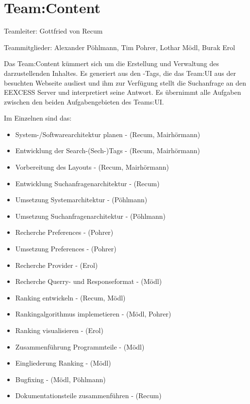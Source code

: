 \section*{Team:Content}

Teamleiter: Gottfried von Recum

Teammitglieder: Alexander Pöhlmann, Tim Pohrer, Lothar Mödl, Burak Erol

Das Team:Content kümmert sich um die Erstellung und Verwaltung des darzustellenden Inhaltes. Es generiert aus den \SEARCH-Tags, die das Team:UI aus der besuchten Webseite ausliest und ihm zur Verfügung stellt die Suchanfrage an den EEXCESS Server und interpretiert seine Antwort. Es übernimmt alle Aufgaben zwischen den beiden Aufgabengebieten des Teams:UI.

Im Einzelnen sind das:

\begin{itemize}
	\item System-/Softwarearchitektur planen - (Recum, Mairhörmann)
	\item Entwicklung der Search-(Sech-)Tags - (Recum, Mairhörmann)
	\item Vorbereitung des Layouts - (Recum, Mairhörmann)
	\item Entwicklung Suchanfragenarchitektur - (Recum)
	\item Umsetzung Systemarchitektur - (Pöhlmann)
	\item Umsetzung Suchanfragenarchitektur - (Pöhlmann)
	\item Recherche Preferences - (Pohrer)
	\item Umsetzung Preferences - (Pohrer)
	\item Recherche Provider - (Erol)
	\item Recherche Querry- und Responseformat - (Mödl)
	\item Ranking entwickeln - (Recum, Mödl)
	\item Rankingalgorithmus implemetieren - (Mödl, Pohrer)
	\item Ranking visualisieren - (Erol)
	\item Zusammenführung Programmteile - (Mödl)
	\item Eingliederung Ranking - (Mödl)
	\item Bugfixing - (Mödl, Pöhlmann)
	\item Dokumentationsteile zusammenführen - (Recum)\\	
\end{itemize}
